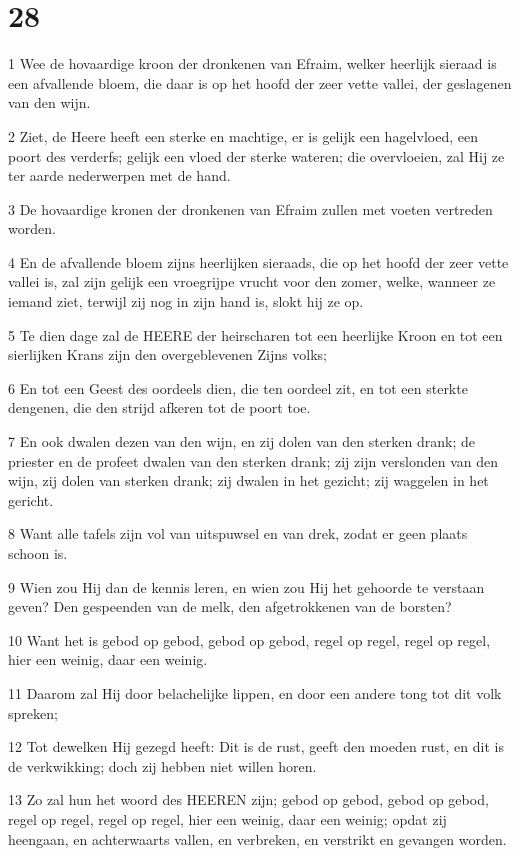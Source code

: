 \chapter{28}

\par 1 Wee de hovaardige kroon der dronkenen van Efraim, welker heerlijk sieraad is een afvallende bloem, die daar is op het hoofd der zeer vette vallei, der geslagenen van den wijn.
\par 2 Ziet, de Heere heeft een sterke en machtige, er is gelijk een hagelvloed, een poort des verderfs; gelijk een vloed der sterke wateren; die overvloeien, zal Hij ze ter aarde nederwerpen met de hand.
\par 3 De hovaardige kronen der dronkenen van Efraim zullen met voeten vertreden worden.
\par 4 En de afvallende bloem zijns heerlijken sieraads, die op het hoofd der zeer vette vallei is, zal zijn gelijk een vroegrijpe vrucht voor den zomer, welke, wanneer ze iemand ziet, terwijl zij nog in zijn hand is, slokt hij ze op.
\par 5 Te dien dage zal de HEERE der heirscharen tot een heerlijke Kroon en tot een sierlijken Krans zijn den overgeblevenen Zijns volks;
\par 6 En tot een Geest des oordeels dien, die ten oordeel zit, en tot een sterkte dengenen, die den strijd afkeren tot de poort toe.
\par 7 En ook dwalen dezen van den wijn, en zij dolen van den sterken drank; de priester en de profeet dwalen van den sterken drank; zij zijn verslonden van den wijn, zij dolen van sterken drank; zij dwalen in het gezicht; zij waggelen in het gericht.
\par 8 Want alle tafels zijn vol van uitspuwsel en van drek, zodat er geen plaats schoon is.
\par 9 Wien zou Hij dan de kennis leren, en wien zou Hij het gehoorde te verstaan geven? Den gespeenden van de melk, den afgetrokkenen van de borsten?
\par 10 Want het is gebod op gebod, gebod op gebod, regel op regel, regel op regel, hier een weinig, daar een weinig.
\par 11 Daarom zal Hij door belachelijke lippen, en door een andere tong tot dit volk spreken;
\par 12 Tot dewelken Hij gezegd heeft: Dit is de rust, geeft den moeden rust, en dit is de verkwikking; doch zij hebben niet willen horen.
\par 13 Zo zal hun het woord des HEEREN zijn; gebod op gebod, gebod op gebod, regel op regel, regel op regel, hier een weinig, daar een weinig; opdat zij heengaan, en achterwaarts vallen, en verbreken, en verstrikt en gevangen worden.
